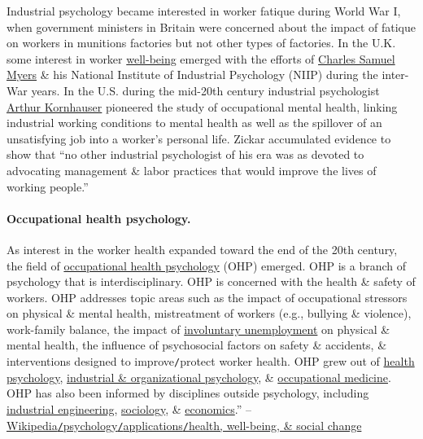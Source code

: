 \documentclass[oneside]{book}
\numberwithin{equation}{section}
\begin{document}
Industrial psychology became interested in worker fatique during World War I, when government ministers in Britain were concerned about the impact of fatique on workers in munitions factories but not other types of factories. In the U.K. some interest in worker \href{https://en.wikipedia.org/wiki/Well-being}{well-being} emerged with the efforts of \href{https://en.wikipedia.org/wiki/Charles_Samuel_Myers}{Charles Samuel Myers} \& his National Institute of Industrial Psychology (NIIP) during the inter-War years. In the U.S. during the mid-20th century industrial psychologist \href{https://en.wikipedia.org/wiki/Arthur_Kornhauser}{Arthur Kornhauser} pioneered the study of occupational mental health, linking industrial working conditions to mental health as well as the spillover of an unsatisfying job into a worker's personal life. Zickar accumulated evidence to show that ``no other industrial psychologist of his era was as devoted to advocating management \& labor practices that would improve the lives of working people.''

\paragraph{Occupational health psychology.}
As interest in the worker health expanded toward the end of the 20th century, the field of \href{https://en.wikipedia.org/wiki/Occupational_health_psychology}{occupational health psychology} (OHP) emerged. OHP is a branch of psychology that is interdisciplinary. OHP is concerned with the health \& safety of workers. OHP addresses topic areas such as the impact of occupational stressors on physical \& mental health, mistreatment of workers (e.g., bullying \& violence), work-family balance, the impact of \href{https://en.wikipedia.org/wiki/Involuntary_unemployment}{involuntary unemployment} on physical \& mental health, the influence of psychosocial factors on safety \& accidents, \& interventions designed to improve\texttt{/}protect worker health. OHP grew out of \href{https://en.wikipedia.org/wiki/Health_psychology}{health psychology}, \href{https://en.wikipedia.org/wiki/Industrial_and_organizational_psychology}{industrial \& organizational psychology}, \& \href{https://en.wikipedia.org/wiki/Occupational_medicine}{occupational medicine}. OHP has also been informed by disciplines outside psychology, including \href{https://en.wikipedia.org/wiki/Industrial_engineering}{industrial engineering}, \href{https://en.wikipedia.org/wiki/Sociology}{sociology}, \& \href{https://en.wikipedia.org/wiki/Economics}{economics}.'' -- \href{https://en.wikipedia.org/wiki/Psychology#Health,_well-being,_and_social_change}{Wikipedia\texttt{/}psychology\texttt{/}applications\texttt{/}health, well-being, \& social change}
\end{document}
